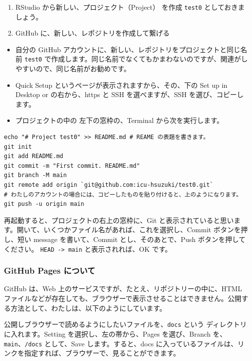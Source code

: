 \documentclass[
]{bxjsbook}
\providecommand{\tightlist}{%
  \setlength{\itemsep}{0pt}\setlength{\parskip}{0pt}}
\theoremstyle{definition}
\theoremstyle{definition}
\theoremstyle{definition}
\theoremstyle{definition}
\theoremstyle{remark}
\begin{document}
\begin{enumerate}
\def\labelenumi{\arabic{enumi}.}
\tightlist
\item
  RStudio から新しい、プロジェクト（Project） を作成 \texttt{test0} としておきましょう。
\item
  GitHub に、新しい、レポジトリを作成して繋げる
\end{enumerate}

\begin{itemize}
\tightlist
\item
  自分の GitHub アカウントに、新しい、レポジトリをプロジェクトと同じ名前 \texttt{test0} で作成します。同じ名前でなくてもかまわないのですが、関連がしやすいので、同じ名前がお勧めです。
\item
  Quick Setup というページが表示されますから、その、下の Set up in Desktop or の右から、https と SSH を選べますが、SSH を選び、コピーします。
\item
  プロジェクトの中の 左下の窓枠の、Terminal から次を実行します。
\end{itemize}

\begin{verbatim}
echo "# Project test0" >> README.md # REAME の表題を書きます。
git init
git add README.md
git commit -m "First commit. README.md"
git branch -M main
git remote add origin `git@github.com:icu-hsuzuki/test0.git`
# わたしのアカウントの場合には、コピーしたものを貼り付けると、上のようになります。
git push -u origin main
\end{verbatim}

再起動すると、プロジェクトの右上の窓枠に、Git と表示されていると思います。開いて、いくつかファイル名があれば、これを選択し、Commit ボタンを押し、短い message を書いて、Commit とし、そのあとで、Push ボタンを押してください。 \texttt{HEAD\ -\textgreater{}\ main} と表示されれば、OK です。

\hypertarget{github-pages-ux306bux3064ux3044ux3066}{%
\subsubsection{GitHub Pages について}\label{github-pages-ux306bux3064ux3044ux3066}}

GitHub は、Web 上のサービスですが、たとえ、リポジトリーの中に、HTML ファイルなどが存在しても、ブラウザーで表示させることはできません。公開する方法として、わたしは、以下のようにしています。

公開しブラウザーで読めるようにしたいファイルを、\texttt{docs} という ディレクトリに入れます。Setting を選択し、左の帯から、Pages を選び、Branch を、\texttt{main}、\texttt{/docs} として、Save します。すると、docs に入っているファイルは、リンクを指定すれば、ブラウザーで、見ることができます。
\end{document}
